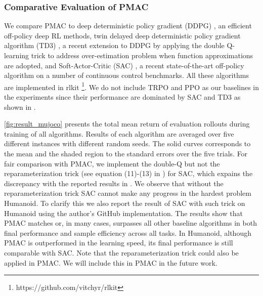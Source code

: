 \subsubsection{Comparative Evaluation of PMAC}

We compare PMAC to deep deterministic policy gradient (DDPG) \citep{lillicrap2015continuous}, an efficient off-policy deep
RL methods, twin delayed deep deterministic policy gradient algorithm (TD3) \citep{fujimoto2018addressing}, a recent extension to DDPG by applying the double Q-learning trick to address over-estimation problem when function approximations are adopted, and Soft-Actor-Critic (SAC) \citep{haarnoja2018soft}, a recent state-of-the-art off-policy algorithm on a number of continuous control benchmarks. All these algorithms are implemented in rlkit \footnote{https://github.com/vitchyr/rlkit}. We do not include TRPO and PPO as our baselines in the experiments since their performance are dominated by SAC and TD3 as shown in \citep{haarnoja2018soft,fujimoto2018addressing}. 

\cref{fig:result_mujoco} presents the total mean return of evaluation rollouts during training of all algorithms. Results of each algorithm are averaged over five different instances with different random seeds. The solid curves corresponds to the mean and the shaded region to the standard errors over the five trials. For fair comparison with PMAC, we implement the double-Q but not the reparameterization trick (see equation (11)-(13) in \citep{haarnoja2018soft}) for SAC, which expains the discrepancy with the reported results in \citep{haarnoja2018soft}. We observe that without the reparameterization trick SAC cannot make any progress in the hardest problem Humanoid. To clarify this we also report the result of SAC with such trick on Humanoid using the author's GitHub implementation. The results show that PMAC matches or, in many cases, surpasses all other baseline algorithms in both final performance and sample efficiency across all tasks. In Humanoid, although PMAC is outperformed in the learning speed, its final performance is still comparable with SAC. Note that the reparameterization trick could also be applied in PMAC. We will include this in PMAC in the future work.



